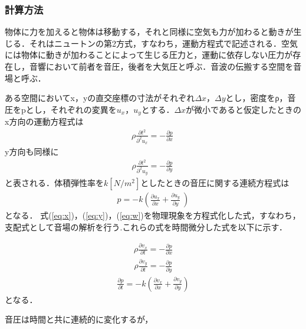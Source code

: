 \documentclass[a4j,12pt]{jsarticle}
\begin{document}
\subsubsection{計算方法}
物体に力を加えると物体は移動する，それと同様に空気も力が加わると動きが生じる．それはニュートンの第2方式，すなわち，運動方程式で記述される．空気には物体に動きが加わることによって生じる圧力と，運動に依存しない圧力が存在し，音響において前者を音圧，後者を大気圧と呼ぶ．音波の伝搬する空間を音場と呼ぶ．

ある空間においてx，yの直交座標の寸法がそれぞれ$\Delta x$，$\Delta y$とし，密度をρ，音圧をpとし，それぞれの変異を$u_x$，$u_y$とする．$\Delta x$が微小であると仮定したときのx方向の運動方程式は
\begin {eqnarray}
\label{eq:x}
\rho \frac {\partial t^2} {  \partial ^2 u_x } = - \frac { \partial p } { \partial x } \
\end{eqnarray}
y方向も同様に
\begin {eqnarray}
\label{eq:y}
\rho \frac {\partial t^2} {  \partial ^2 u_y } = - \frac { \partial p } { \partial y } \
\end{eqnarray}
と表される．体積弾性率を$k[N/m^2]$としたときの音圧に関する連続方程式は
\begin {eqnarray}
\label{eq:w}
p = -k ( \frac { \partial u _ x } { \partial x } + \frac { \partial u_y } { \partial y } \ )
\end{eqnarray}
となる．
式(\ref{eq:x})，(\ref{eq:y})，(\ref{eq:w})を物理現象を方程式化した式，すなわち，支配式として音場の解析を行う.これらの式を時間微分した式を以下に示す．

\begin {eqnarray}
\label{eq :  x-2}
\rho \frac{ \partial v_x } { \partial t } = - \frac { \partial p }{ \partial x }
\end{eqnarray}
\begin {eqnarray}
\label{eq :  y-2}
\rho \frac{ \partial v_y } { \partial t } = - \frac { \partial p }{ \partial y }
\end{eqnarray}
\begin {eqnarray}
\label{eq :  w-2}
\frac{ \partial p } { \partial t } = - k ( \frac { \partial v_x }{ \partial x } + \frac { \partial v_y }{ \partial y } ) 
\end{eqnarray}
となる．

音圧は時間と共に連続的に変化するが，
\end{document}
